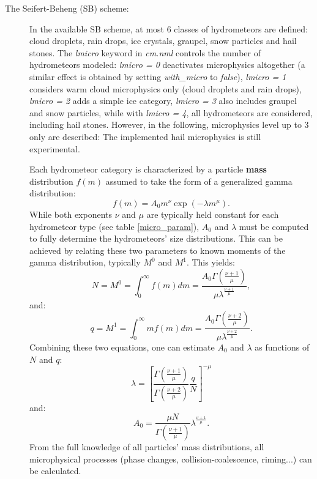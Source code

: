 \documentclass[12pt,A4,french]{article}
\begin{document}
\begin{description}

\item[The Seifert-Beheng (SB) scheme:]
In the available SB scheme, at most 6 classes of hydrometeors are defined: cloud droplets, rain drops, ice crystals, graupel, snow particles and hail stones. The {\it lmicro} keyword in {\it cm.nml} controls the number of hydrometeors modeled: {\it lmicro = 0} deactivates microphysics altogether (a similar effect is obtained by setting {\it with\_micro} to {\it false}), {\it lmicro = 1} considers warm cloud microphysics only (cloud droplets and rain drops), {\it lmicro = 2} adds a simple ice category, {\it lmicro = 3} also includes graupel and snow particles, while with {\it lmicro = 4}, all hydrometeors are considered, including hail stones. However, in the following, microphysics level up to 3 only are described: The implemented hail microphysics is still experimental.

Each hydrometeor category is characterized by a particle {\bf mass} distribution $f\left(m\right)$ assumed to take the form of a generalized gamma distribution:
\begin{equation}
f\left(m\right) = A_0 m^\nu \exp\left(-\lambda m^\mu\right).
\label{gamma}
\end{equation}
While both exponents $\nu$ and $\mu$ are typically held constant for each hydrometeor type (see table \ref{micro_param}), $A_0$ and $\lambda$ must be computed to fully determine the hydrometeors' size distributions. This can be achieved by relating these two parameters to known moments of the gamma distribution, typically $M^0$ and $M^{1}$. This yields:
\begin{equation}
N = M^0 = \int_0^\infty f\left(m\right) dm = \frac{A_0 \Gamma\left(\frac{\nu + 1}{\mu}\right)}{\mu \lambda^{\frac{\nu + 1}{\mu}}},
\end{equation}
and:
\begin{equation}
q = M^1 = \int_0^\infty m f\left(m\right) dm = \frac{A_0 \Gamma\left(\frac{\nu + 2}{\mu}\right)}{\mu \lambda^{\frac{\nu + 2}{\mu}}}.
\end{equation}
Combining these two equations, one can estimate $A_0$ and $\lambda$ as functions of $N$ and $q$:
\begin{equation}
\lambda = \left[\frac{\Gamma\left(\frac{\nu + 1}{\mu}\right)}{\Gamma\left(\frac{\nu + 2}{\mu}\right)}\frac{q}{N}\right]^{-\mu}
\label{lambda}
\end{equation}
and:
\begin{equation}
A_0 = \frac{\mu N}{\Gamma\left(\frac{\nu + 1}{\mu}\right)} \lambda^{\frac{\nu + 1}{\mu}}.
\label{a0}
\end{equation}
From the full knowledge of all particles' mass distributions, all microphysical processes (phase changes, collision-coalescence, riming...) can be calculated.


\end{description}
\end{document}
